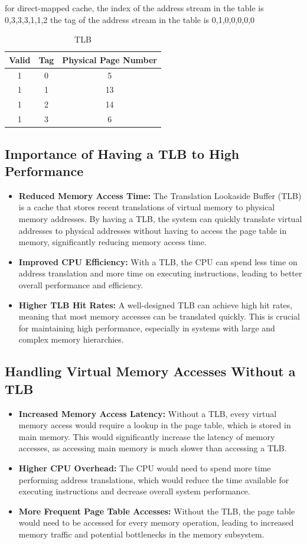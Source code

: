 \documentclass[cn,12pt]{homework}
\begin{document}
\begin{solution}
for direct-mapped cache,
the index of the address stream in the table is 0,3,3,3,1,1,2
the tag of the address stream in the table is   0,1,0,0,0,0,0


\begin{table}[H]
\centering
\caption{TLB}
\begin{tabular}{|c|c|c|}
\hline
Valid & Tag & Physical Page Number \\ \hline
1 & 0 & 5 \\ \hline
1 & 1 & 13 \\ \hline
1 & 2 & 14 \\ \hline
1 & 3 & 6 \\ \hline
\end{tabular}
\end{table}

\subsection*{Importance of Having a TLB to High Performance}
\begin{itemize}
  \item \textbf{Reduced Memory Access Time:} The Translation Lookaside Buffer (TLB) is a cache that stores recent translations of virtual memory to physical memory addresses. By having a TLB, the system can quickly translate virtual addresses to physical addresses without having to access the page table in memory, significantly reducing memory access time.
  \item \textbf{Improved CPU Efficiency:} With a TLB, the CPU can spend less time on address translation and more time on executing instructions, leading to better overall performance and efficiency.
  \item \textbf{Higher TLB Hit Rates:} A well-designed TLB can achieve high hit rates, meaning that most memory accesses can be translated quickly. This is crucial for maintaining high performance, especially in systems with large and complex memory hierarchies.
\end{itemize}

\subsection*{Handling Virtual Memory Accesses Without a TLB}
\begin{itemize}
  \item \textbf{Increased Memory Access Latency:} Without a TLB, every virtual memory access would require a lookup in the page table, which is stored in main memory. This would significantly increase the latency of memory accesses, as accessing main memory is much slower than accessing a TLB.
  \item \textbf{Higher CPU Overhead:} The CPU would need to spend more time performing address translations, which would reduce the time available for executing instructions and decrease overall system performance.
  \item \textbf{More Frequent Page Table Accesses:} Without the TLB, the page table would need to be accessed for every memory operation, leading to increased memory traffic and potential bottlenecks in the memory subsystem.
\end{itemize}



\end{solution}
\end{document}
